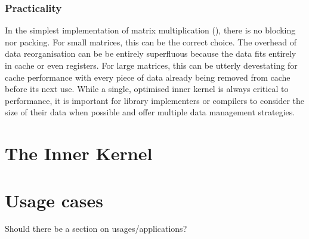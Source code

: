 \documentclass[\main/thesis.tex]{subfiles}
\begin{document}
\subsubsection{Practicality}
In the simplest implementation of matrix multiplication (\ie {}), there is no blocking nor packing.
For small matrices, this can be the correct choice.
The overhead of data reorganisation can be be entirely superfluous because the data fits entirely in cache or even registers.
For large matrices, this can be utterly devestating for cache performance with every piece of data already being removed from cache before its next use.
While a single, optimised inner kernel is always critical to performance, it is important for library implementers or compilers to consider the size of their data when possible and offer multiple data management strategies.

\section{The Inner Kernel}

\section{Usage cases}
Should there be a section on usages/applications?
\end{document}
